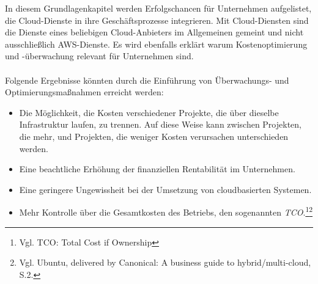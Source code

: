 In diesem Grundlagenkapitel werden Erfolgschancen für Unternehmen aufgelistet, die Cloud-Dienste in ihre Geschäftsprozesse integrieren. Mit Cloud-Diensten sind die Dienste eines beliebigen Cloud-Anbieters im Allgemeinen gemeint und nicht ausschließlich AWS-Dienste. 
Es wird ebenfalls erklärt warum Kostenoptimierung und -überwachung relevant für Unternehmen sind.
\\\\
Folgende Ergebnisse könnten durch die Einführung von Überwachungs- und Optimierungsmaßnahmen erreicht werden:
\begin{itemize}
      \item
            Die Möglichkeit, die Kosten verschiedener Projekte, die über dieselbe Infrastruktur laufen, zu trennen.
            Auf diese Weise kann zwischen Projekten, die mehr, und Projekten, die weniger Kosten verursachen unterschieden werden.%
      \item
            Eine beachtliche Erhöhung der finanziellen Rentabilität im Unternehmen.%
      \item
            Eine geringere Ungewissheit bei der Umsetzung von cloudbasierten Systemen.
      \item
            Mehr Kontrolle über die Gesamtkosten des Betriebs, den sogenannten \textit{TCO}.\footnote{Vgl. TCO: Total Cost if Ownership}\footnote{Vgl. Ubuntu, delivered by Canonical: A business guide to hybrid/multi-cloud, S.2.\cite{CAN01}}

\end{itemize}



